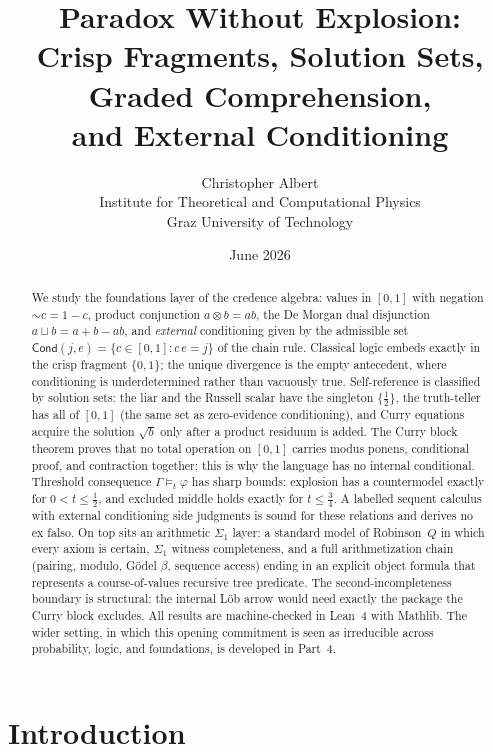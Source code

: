 \documentclass[11pt,a4paper]{article}
\title{Paradox Without Explosion:\\
Crisp Fragments, Solution Sets, Graded Comprehension,\\
and External Conditioning}
\author{Christopher Albert\\
\small Institute for Theoretical and Computational Physics\\
\small Graz University of Technology}
\date{June 2026}
\newcommand{\negc}{\mathord{\sim}}
\newcommand{\conjc}{\otimes}
\newcommand{\disjc}{\sqcup}
\newcommand{\Cond}{\mathsf{Cond}}
\begin{document}
\maketitle

\begin{abstract}
We study the foundations layer of the credence algebra: values in
$[0,1]$ with negation $\negc c = 1 - c$, product conjunction
$a \conjc b = ab$, the De Morgan dual disjunction
$a \disjc b = a + b - ab$, and \emph{external} conditioning given by the
admissible set $\Cond(j,e) = \{c \in [0,1] : c\,e = j\}$ of the chain
rule.
Classical logic embeds exactly in the crisp fragment $\{0,1\}$;
the unique divergence is the empty antecedent, where conditioning is
underdetermined rather than vacuously true.
Self-reference is classified by solution sets: the liar and the Russell
scalar have the singleton $\{\tfrac12\}$, the truth-teller has all of
$[0,1]$ (the same set as zero-evidence conditioning), and Curry
equations acquire the solution $\sqrt b$ only after a product residuum
is added.
The Curry block theorem proves that no total operation on $[0,1]$
carries modus ponens, conditional proof, and contraction together;
this is why the language has no internal conditional.
Threshold consequence $\Gamma \models_t \varphi$ has sharp bounds:
explosion has a countermodel exactly for $0 < t \leq \tfrac12$, and
excluded middle holds exactly for $t \leq \tfrac34$.
A labelled sequent calculus with external conditioning side judgments
is sound for these relations and derives no ex falso.
On top sits an arithmetic $\Sigma_1$ layer: a standard model of
Robinson~$Q$ in which every axiom is certain, $\Sigma_1$ witness
completeness, and a full arithmetization chain (pairing, modulo,
G\"odel $\beta$, sequence access) ending in an explicit object formula
that represents a course-of-values recursive tree predicate.
The second-incompleteness boundary is structural: the internal L\"ob
arrow would need exactly the package the Curry block excludes.
All results are machine-checked in Lean~4 with Mathlib.
The wider setting, in which this opening commitment is seen as
irreducible across probability, logic, and foundations, is developed
in Part~4.
\end{abstract}

\section{Introduction}
\label{sec:intro}
\end{document}
